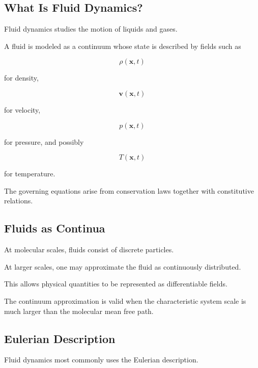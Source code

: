 \subsection{What Is Fluid Dynamics?}
\label{subsec:what-is-fluid-dynamics}

Fluid dynamics studies the motion of liquids and gases.

A fluid is modeled as a continuum whose state is described by fields such as

\[
\boxed{
\rho(\mathbf{x},t)
}
\]

for density,

\[
\boxed{
\mathbf{v}(\mathbf{x},t)
}
\]

for velocity,

\[
\boxed{
p(\mathbf{x},t)
}
\]

for pressure, and possibly

\[
\boxed{
T(\mathbf{x},t)
}
\]

for temperature.

The governing equations arise from conservation laws together with
constitutive relations.

\subsection{Fluids as Continua}
\label{subsec:fluids-as-continua}

At molecular scales, fluids consist of discrete particles.

At larger scales, one may approximate the fluid as continuously distributed.

This allows physical quantities to be represented as differentiable fields.

The continuum approximation is valid when the characteristic system scale is
much larger than the molecular mean free path.

\subsection{Eulerian Description}
\label{subsec:fluid-eulerian-description}

Fluid dynamics most commonly uses the Eulerian description.

